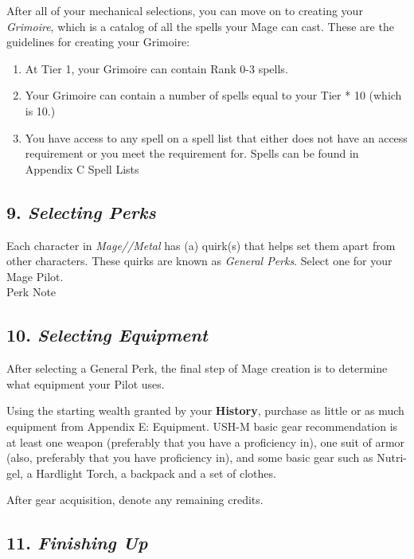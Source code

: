\documentclass[
]{article}
\providecommand{\tightlist}{%
  \setlength{\itemsep}{0pt}\setlength{\parskip}{0pt}}
\begin{document}
After all of your mechanical selections, you can move on to creating
your \emph{Grimoire}, which is a catalog of all the spells your Mage can
cast. These are the guidelines for creating your Grimoire:

\begin{enumerate}
\tightlist
\item
  At Tier 1, your Grimoire can contain Rank 0-3 spells.
\item
  Your Grimoire can contain a number of spells equal to your Tier * 10
  (which is 10.)
\item
  You have access to any spell on a spell list that either does not have
  an access requirement or you meet the requirement for. Spells can be
  found in Appendix C Spell Lists
\end{enumerate}

\hypertarget{selecting-perks}{%
\subsection{\texorpdfstring{9. \emph{Selecting
Perks}}{9. Selecting Perks}}\label{selecting-perks}}

Each character in {{\emph{Mage//Metal}}} has (a) quirk(s) that helps set
them apart from other characters. These quirks are known as
\emph{General Perks}. Select one for your Mage Pilot.\\
{Perk Note}

\hypertarget{selecting-equipment}{%
\subsection{\texorpdfstring{10. \emph{Selecting
Equipment}}{10. Selecting Equipment}}\label{selecting-equipment}}

After selecting a General Perk, the final step of Mage creation is to
determine what equipment your Pilot uses.

Using the starting wealth granted by your \textbf{History}, purchase as
little or as much equipment from Appendix E: Equipment. USH-M basic gear
recommendation is at least one weapon (preferably that you have a
proficiency in), one suit of armor (also, preferably that you have
proficiency in), and some basic gear such as Nutri-gel, a Hardlight
Torch, a backpack and a set of clothes.

After gear acquisition, denote any remaining credits.

\hypertarget{finishing-up}{%
\subsection{\texorpdfstring{11. \emph{Finishing
Up}}{11. Finishing Up}}\label{finishing-up}}
\end{document}
